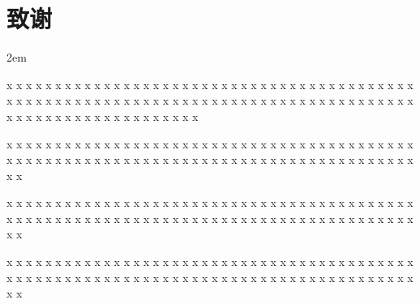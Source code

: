 \clearpage
{}
{}

\begingroup
    \section*{致\quad\quad 谢}

    \songti
    \setlength{\baselineskip}{25pt}
    \setlength{\parskip}{0pt}
    \parindent 2em

    x x x x x x x x x x x x x x x x x x x x x x x x x x x x x x x x x x x x x x x x x x x x x x x x x x x x x x x x x x x x x x x x x x x x x x x x x x x x x x x x x x x x x x x x x x x x x x x x x x x x x x x x

    x x x x x x x x x x x x x x x x x x x x x x x x x x x x x x x x x x x x x x x x x x x x x x x x x x x x x x x x x x x x x x x x x x x x x x x x x x x x x x x x x x x x x x

    x x x x x x x x x x x x x x x x x x x x x x x x x x x x x x x x x x x x x x x x x x x x x x x x x x x x x x x x x x x x x x x x x x x x x x x x x x x x x x x x x x x x x x

    x x x x x x x x x x x x x x x x x x x x x x x x x x x x x x x x x x x x x x x x x x x x x x x x x x x x x x x x x x x x x x x x x x x x x x x x x x x x x x x x x x x x x x
    \par 
\endgroup
